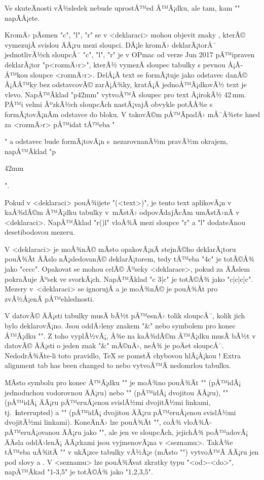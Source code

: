 Ve skuteÄnosti vÃ½sledek nebude uprostÅ™ed Å™Ã¡dku, ale tam, kam "\table"
napÃ­Å¡ete. 

KromÄ› pÃ­smen "c", "l", "r" se v <deklaraci> mohou objevit znaky
, kterÃ© vymezujÃ­ svislou ÄÃ¡ru mezi sloupci. 
DÃ¡le kromÄ› deklarÃ¡torÅ¯ jednotlivÃ½ch sloupcÅ¯ "c", "l", "r" je v OPmac od verze Jun
2017 pÅ™ipraven deklarÃ¡tor "p{<rozmÄ›r>}", kterÃ½ vymezÃ­ sloupec
tabulky s pevnou Å¡Ã­Å™kou sloupce <rozmÄ›r>. DelÅ¡Ã­ text se formÃ¡tuje jako odstavec
danÃ© Å¡Ã­Å™ky bez odstavcovÃ© zarÃ¡Å¾ky, kratÅ¡Ã­ jednoÅ™Ã¡dkovÃ½ text je vlevo. NapÅ™Ã­klad
"p{42mm}"
vytvoÅ™Ã­ sloupec pro text Å¡irokÃ½ 42\,mm. PÅ™i velmi ÃºzkÃ½ch sloupcÃ­ch nastÃ¡vajÃ­
obvykle potÃ­Å¾e s formÃ¡tovÃ¡nÃ­m odstavce do bloku. V takovÃ©m pÅ™Ã­padÄ› mÅ¯Å¾ete
hned za <rozmÄ›r> pÅ™idat tÅ™eba "\raggedright" a odstavec bude formÃ¡tovÃ¡n 
s~nezarovnanÃ½m pravÃ½m okrajem, napÅ™Ã­klad "p{42mm\raggedright}".

Pokud v <deklaraci> pouÅ¾ijete "(<text>)", je tento text aplikovÃ¡n v kaÅ¾dÃ©m
Å™Ã¡dku tabulky v~mÃ­stÄ› odpovÃ­dajÃ­cÃ­m umÃ­stÄ›nÃ­ v <deklaraci>. NapÅ™Ã­klad "r(\kern10pt)l"
vloÅ¾Ã­ mezi sloupce "r" a "l" dodateÄnou desetibodovou mezeru.

V <deklaraci> je moÅ¾nÃ© mÃ­sto opakovÃ¡nÃ­ stejnÃ©ho deklarÃ¡toru pouÅ¾Ã­t ÄÃ­slo
nÃ¡sledovanÃ© deklarÃ¡torem, tedy tÅ™eba "4c" je totÃ©Å¾ jako "cccc". Opakovat se
mohou celÃ© Ãºseky <deklarace>, pokud za ÄÃ­slem pokraÄuje Ãºsek ve svorkÃ¡ch.
NapÅ™Ã­klad "c 3{|c}" je totÃ©Å¾ jako "c|c|c|c".  Mezery v~<deklaraci> se ignorujÃ­ a
je moÅ¾nÃ© je pouÅ¾Ã­t pro zvÃ½Å¡enÃ­ pÅ™ehlednosti.

V datovÃ© ÄÃ¡sti tabulky musÃ­ bÃ½t pÅ™esnÄ› tolik sloupcÅ¯, kolik jich bylo deklarovÃ¡no.
Jsou oddÄ›leny znakem "&" nebo symbolem pro konec Å™Ã¡dku "\cr". Z toho vyplÃ½vÃ¡,
Å¾e na kaÅ¾dÃ©m Å™Ã¡dku musÃ­ bÃ½t v datovÃ© ÄÃ¡sti o jeden znak "&" mÃ©nÄ›, neÅ¾ je poÄet sloupcÅ¯.
NedodrÅ¾Ã­te-li toto pravidlo, \TeX{} se pomstÃ­ chybovou hlÃ¡Å¡kou
\begtt
! Extra alignment tab has been changed to \cr
\endtt  
%
nebo vytvoÅ™Ã­ nedomrlou tabulku. 

MÃ­sto symbolu pro konec Å™Ã¡dku "\cr" je moÅ¾no
pouÅ¾Ã­t "\crl" (pÅ™idÃ¡ jednoduchou vodorovnou ÄÃ¡ru) nebo "\crll" (pÅ™idÃ¡ dvojitou
ÄÃ¡ru), "\crli" (pÅ™idÃ¡ ÄÃ¡ru pÅ™eruÅ¡enou svislÃ½mi dvojitÃ½mi linkami, 
tj.~{\bf i}nterrupted) a 
"\crlli" (pÅ™idÃ¡ dvojitou ÄÃ¡ru pÅ™eruÅ¡enou svislÃ½mi dvojitÃ½mi linkami).
KoneÄnÄ› lze pouÅ¾Ã­t "", coÅ¾ vloÅ¾Ã­ pÅ™eruÅ¡ovanou ÄÃ¡ru jako
"\crli", ale jen ve sloupcÃ­ch, jejichÅ¾ poÅ™adovÃ¡ ÄÃ­sla oddÄ›lenÃ¡ ÄÃ¡rkami 
jsou vyjmenovÃ¡na v <seznamu>. TakÅ¾e tÅ™eba uÅ¾itÃ­ "" v ukÃ¡zce tabulky vÃ½Å¡e
(mÃ­sto "\crli") vytvoÅ™Ã­ ÄÃ¡ru jen pod slovy  a . V
<seznamu> lze pouÅ¾Ã­vat zkratky typu "<od>-<do>", napÅ™Ã­kad "1-3,5" je totÃ©Å¾ jako
"1,2,3,5".

